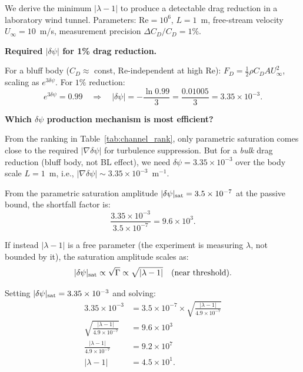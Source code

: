 \documentclass[11pt,twocolumn]{article}
\newcommand{\dpsi}{\delta\psi}
\newcommand{\lam}{\lambda}
\newcommand{\Rey}{\mathrm{Re}}
\begin{document}
We derive the minimum $|\lam-1|$ to produce a detectable drag reduction in
a laboratory wind tunnel. Parameters: $\Rey = 10^6$, $L = 1$~m, free-stream
velocity $U_\infty = 10$~m/s, measurement precision $\Delta C_D/C_D = 1\%$.

\textbf{Required $|\dpsi|$ for 1\% drag reduction.}

For a bluff body ($C_D \approx$ const, Re-independent at high Re):
$F_D = \frac{1}{2}\rho C_D A U_\infty^2$, scaling as $e^{3\dpsi}$. For
$1\%$ reduction:
\begin{equation}
e^{3\dpsi} = 0.99 \quad\Longrightarrow\quad
|\dpsi| = -\frac{\ln 0.99}{3} = \frac{0.01005}{3} = 3.35\times10^{-3}.
\label{eq:dpsi_required}
\end{equation}

\textbf{Which $\dpsi$ production mechanism is most efficient?}

From the ranking in Table~\ref{tab:channel_rank}, only parametric
saturation comes close to the required $|\nabla\dpsi|$ for turbulence
suppression. But for a \emph{bulk} drag reduction (bluff body, not BL effect),
we need $\dpsi = 3.35\times10^{-3}$ over the body scale $L = 1$~m, i.e.,
$|\nabla\dpsi| \sim 3.35\times10^{-3}$~m$^{-1}$.

From the parametric saturation amplitude $|\dpsi|_{\rm sat} = 3.5\times10^{-7}$
at the passive bound, the shortfall factor is:
\begin{equation}
\frac{3.35\times10^{-3}}{3.5\times10^{-7}} = 9.6\times10^3.
\label{eq:shortfall}
\end{equation}

If instead $|\lam-1|$ is a free parameter (the experiment is measuring
$\lam$, not bounded by it), the saturation amplitude scales as:
\begin{equation}
|\dpsi|_{\rm sat} \propto \sqrt{\Gamma} \propto \sqrt{|\lam-1|}
\quad (\text{near threshold}).
\label{eq:dpsi_vs_lambda}
\end{equation}

Setting $|\dpsi|_{\rm sat} = 3.35\times10^{-3}$ and solving:
\begin{align}
3.35\times10^{-3} &= 3.5\times10^{-7}\times
\sqrt{\frac{|\lam-1|}{4.9\times10^{-7}}}
\nonumber\\
\sqrt{\frac{|\lam-1|}{4.9\times10^{-7}}} &= 9.6\times10^3
\nonumber\\
\frac{|\lam-1|}{4.9\times10^{-7}} &= 9.2\times10^7
\nonumber\\
|\lam-1| &= 4.5\times10^1.
\label{eq:lambda_windtunnel}
\end{align}
\end{document}
